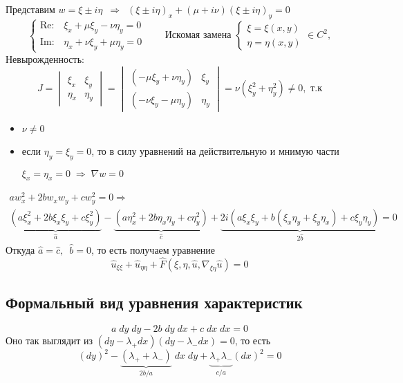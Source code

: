 \documentclass[../main.tex]{subfiles}
\begin{document}
Представим $w = \xi \pm i\eta \;\ \Rightarrow\;\ 
(\xi \pm i\eta)_x + (\mu + i\nu)(\xi \pm i\eta)_y = 0$
$$
\begin{cases}
    \mathrm{Re:} & \xi_x + \mu\xi_y - \nu\eta_y = 0\\
    \mathrm{Im:} & \eta_x + \nu\xi_y + \mu\eta_y = 0
\end{cases}\qquad \text{Искомая замена }
\begin{cases}
    \xi = \xi(x, y) \\
    \eta = \eta(x, y)
\end{cases} \in C^2,
$$
Невырожденность:
$$ J = 
\begin{vmatrix}
    \xi_x & \xi_y \\
    \eta_x & \eta_y
\end{vmatrix} =
\begin{vmatrix}
    (-\mu\xi_y + \nu\eta_y) & \xi_y \\
    (-\nu\xi_y - \mu\eta_y) & \eta_y
\end{vmatrix} =
\nu (\xi_y^2 + \eta_y^2) \neq 0, \text{ т.к} $$
\begin{itemize}[nolistsep]
    \item $\nu \neq 0$
    \item если $\eta_y = \xi_y = 0$, то в силу уравнений на действительную и мнимую части
    
    $\xi_x = \eta_x = 0 \; \Rightarrow \; \nabla w = 0$
\end{itemize}
\begin{multline*}
a w_x^2 + 2bw_x w_y + c w_y^2 = 0 \Rightarrow \\
\underbrace{(a\xi^2_x + 2b\xi_x\xi_y + c\xi_y^2)}_{\hat a} -
\underbrace{(a\eta_x^2 + 2b\eta_x\eta_y + c\eta_y^2)}_{\hat c}+ 
\underbrace{2i(a\xi_x\xi_y + b(\xi_x\eta_y + \xi_y\eta_x) + c\xi_y\eta_y)}_{2\hat b} = 0
\end{multline*}
Откуда $\hat a = \hat c,\;\ \hat b = 0$, то есть получаем уравнение
$$
\hat u_{\xi\xi} + \hat u_{\eta\eta} + \hat F(\xi, \eta, \hat u, \nabla_{\xi\eta}\hat u) = 0
$$
\subsection{Формальный вид уравнения характеристик}
$$
a\;dy\;dy - 2b\;dy\;dx + c\;dx\;dx =0
$$
Оно так выглядит из $(dy - \lambda_+dx)(dy - \lambda_-dx)=0$, то есть 
$$
(dy)^2 - \underbrace{(\lambda_+ + \lambda_-)}_{2b/a}\;dx\;dy + \underbrace{\lambda_+\lambda_-}_{c/a}(dx)^2 = 0
$$
\end{document}
